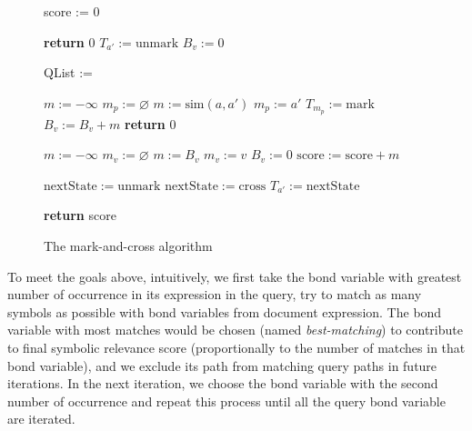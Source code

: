 \documentclass{acm_proc_article-sp}
\begin{document}
\begin{figure}
\begin{algorithmic}[1]

\State score := 0

\State \textbf{return} 0 
\EndIf
{}
\State $T_{a'} := \mathrm{unmark}$ 
\EndFor
{}
\State $B_v := 0$ 
\EndFor

\State QList := 


\State $m := -\infty$
\State $m_p := \varnothing$
\State $m := \mathrm{sim}(a, a')$ 
\State $m_p := a'$ 
\EndIf
\EndFor
{}
\State $T_{m_p} := \mathrm{mark}$ 
\State $B_v := B_v + m$
\Else
{}
\State \textbf{return} 0 
\EndIf
\EndFor

\label{line_bond_finish}

\State $m := -\infty$
\State $m_v := \varnothing $
\State $m := B_v$ 
\State $m_v := v$ 
\EndIf
\State $B_v := 0$ 
\EndFor
\State $\mathrm{score} := \mathrm{score} + m$ 

\State $\mathrm{nextState} := \mathrm{unmark}$ 
\Else
\State $\mathrm{nextState} := \mathrm{cross}$ 
\EndIf
{}
\State $T_{a'} := \mathrm{nextState}$ 
\EndIf
\EndFor
\EndFor

\EndIf

\EndFor

\State \textbf{return} score
\EndProcedure

\end{algorithmic}
\caption{The mark-and-cross algorithm}\label{markcrossalgo}
\end{figure}

To meet the goals above, intuitively, we first take the bond variable with greatest number of occurrence in its expression in the query, try to match as many symbols as possible with bond variables from document expression. 
The bond variable with most matches would be chosen (named \textit{best-matching}) to contribute to final symbolic relevance score (proportionally to the number of matches in that bond variable), 
and we exclude its path from matching query paths in future iterations.
In the next iteration, we choose the bond variable with the second number of occurrence and repeat this process until all the query bond variable are iterated.
\end{document}
